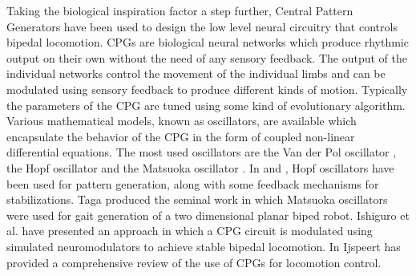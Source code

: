 \documentclass[12pt,twoside]{article}
\theoremstyle{plain}
\theoremstyle{definition}
\theoremstyle{remark}
\newcommand{\forceindent}{\leavevmode{\parindent=2em\indent}}
\begin{document}
\forceindent Taking the biological inspiration factor a step further, Central Pattern Generators have been used to design the low level neural circuitry that controls bipedal locomotion. CPGs are biological neural networks which produce rhythmic output on their own without the need of any sensory feedback. The output of the individual networks control the movement of the individual limbs and can be modulated using sensory feedback to produce different kinds of motion. Typically the parameters of the CPG are tuned using some kind of evolutionary algorithm. Various mathematical models, known as oscillators, are available which encapsulate the behavior of the CPG in the form of coupled non-linear differential equations. The most used oscillators are the Van der Pol oscillator \cite{kanamaru2007van}, the Hopf oscillator \cite{Righetti2006} and the Matsuoka oscillator \cite{Matsuoka1985,Matsuoka1987}. In \cite{Righetti2006} and \cite{Kieboom2009}, Hopf oscillators have been used for pattern generation, along with some feedback mechanisms for stabilizations. Taga \cite{Taga1991} produced the seminal work in which Matsuoka oscillators were used for gait generation of a two dimensional planar biped robot. Ishiguro et al. \cite{Ishiguro2003} have presented an approach in which a CPG circuit is modulated using simulated neuromodulators to achieve stable bipedal locomotion. In \cite{Ijspeert2008} Ijspeert has provided a comprehensive review of the use of CPGs for locomotion control.
\end{document}
